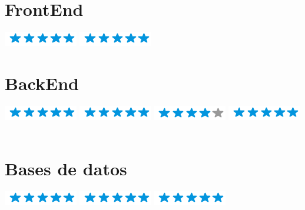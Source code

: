 \documentclass[]{cv-class}
\begin{document}
\begin{aside}
	\section{FrontEnd}
	{\includegraphics[scale=0.40]{img/5stars.png}}
	{\includegraphics[scale=0.40]{img/5stars.png}}
	~

	\section{BackEnd}
	{\includegraphics[scale=0.40]{img/5stars.png}}
	{\includegraphics[scale=0.40]{img/5stars.png}}
	{\includegraphics[scale=0.40]{img/4stars.png}}
	{\includegraphics[scale=0.40]{img/5stars.png}}
	~

	\section{Bases de datos}
	{\includegraphics[scale=0.40]{img/5stars.png}}
	{\includegraphics[scale=0.40]{img/5stars.png}}
	{\includegraphics[scale=0.40]{img/5stars.png}}

\end{aside}
\end{document}
